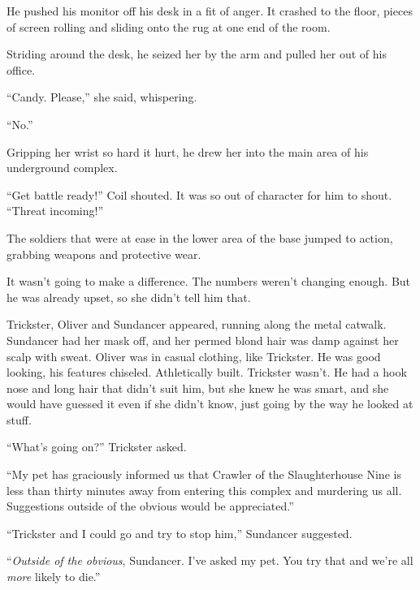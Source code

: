 He pushed his monitor off his desk in a fit of anger.  It crashed to the floor, pieces of screen rolling and sliding onto the rug at one end of the room.



Striding around the desk, he seized her by the arm and pulled her out of his office.



``Candy.  Please,'' she said, whispering.



``No.''



Gripping her wrist so hard it hurt, he drew her into the main area of his underground complex.



``Get battle ready!'' Coil shouted.  It was so out of character for him to shout.  ``Threat incoming!''



The soldiers that were at ease in the lower area of the base jumped to action, grabbing weapons and protective wear.



It wasn't going to make a difference.  The numbers weren't changing enough.  But he was already upset, so she didn't tell him that.



Trickster, Oliver and Sundancer appeared, running along the metal catwalk.  Sundancer had her mask off, and her permed blond hair was damp against her scalp with sweat.  Oliver was in casual clothing, like Trickster.  He was good looking, his features chiseled.  Athletically built.  Trickster wasn't.  He had a hook nose and long hair that didn't suit him, but she knew he was smart, and she would have guessed it even if she didn't know, just going by the way he looked at stuff.



``What's going on?'' Trickster asked.



``My pet has graciously informed us that Crawler of the Slaughterhouse Nine is less than thirty minutes away from entering this complex and murdering us all.  Suggestions outside of the obvious would be appreciated.''



``Trickster and I could go and try to stop him,'' Sundancer suggested.



``\emph{Outside of the obvious}, Sundancer.  I've asked my pet.  You try that and we're all \emph{more} likely to die.''



